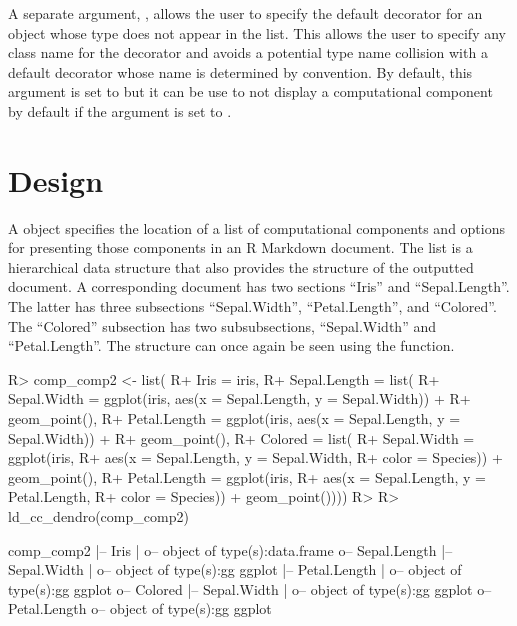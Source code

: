 \documentclass[
]{jss}
\begin{document}
A separate argument, , allows the user to
specify the default decorator for an object whose type does not appear
in the  list. This allows the user to specify any class
name for the decorator and avoids a potential type name collision with a
default decorator whose name is determined by convention. By default,
this argument is set to  but it can be use to not display
a computational component by default if the argument is set to
.

\hypertarget{design}{%
\section{Design}\label{design}}

A  object specifies the location of a list of
computational components and options for presenting those components in
an R Markdown document. The list is a hierarchical data structure that
also provides the structure of the outputted document. A corresponding
document has two sections ``Iris'' and ``Sepal.Length''. The latter has
three subsections ``Sepal.Width'', ``Petal.Length'', and ``Colored''.
The ``Colored'' subsection has two subsubsections, ``Sepal.Width'' and
``Petal.Length''. The structure can once again be seen using the
 function.

\begin{CodeChunk}

\begin{CodeInput}
R> comp_comp2 <- list(
R+   Iris = iris,
R+   Sepal.Length = list(
R+     Sepal.Width = ggplot(iris, aes(x = Sepal.Length, y = Sepal.Width)) + 
R+       geom_point(),
R+     Petal.Length = ggplot(iris, aes(x = Sepal.Length, y = Sepal.Width)) + 
R+       geom_point(),
R+     Colored = list(
R+       Sepal.Width = ggplot(iris, 
R+                           aes(x = Sepal.Length, y = Sepal.Width, 
R+                               color = Species)) + geom_point(),
R+       Petal.Length = ggplot(iris,
R+                             aes(x = Sepal.Length, y = Petal.Length, 
R+                                 color = Species)) + geom_point())))
R> 
R> ld_cc_dendro(comp_comp2)
\end{CodeInput}

\begin{CodeOutput}

comp_comp2
  |-- Iris
  |  o-- object of type(s):data.frame
  o-- Sepal.Length
   |-- Sepal.Width
   |  o-- object of type(s):gg ggplot
   |-- Petal.Length
   |  o-- object of type(s):gg ggplot
   o-- Colored
    |-- Sepal.Width
    |  o-- object of type(s):gg ggplot
    o-- Petal.Length
       o-- object of type(s):gg ggplot
\end{CodeOutput}
\end{CodeChunk}
\end{document}
